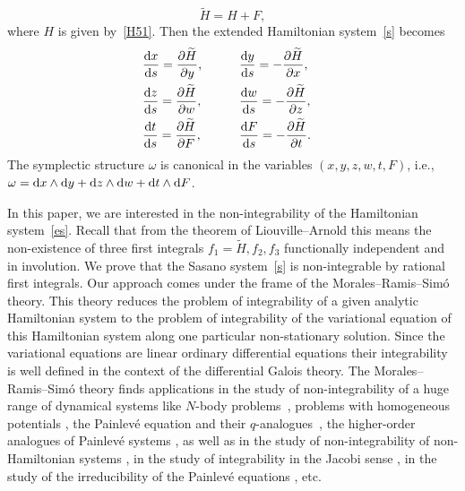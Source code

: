 \documentclass[10pt,a4paper]{amsart}
\numberwithin{equation}{section}
\begin{document}
 \[
 \widetilde{H}=H+F ,
 \]
 where $H$ is given by~\eqref{H51}. Then the extended Hamiltonian system~\eqref{s} becomes
 \begin{alignat}{3}
 &\frac{{\rm d} x}{{\rm d} s}=\frac{\partial \widetilde{H}}{\partial y},\qquad &&
 \frac{{\rm d} y}{{\rm d} s}=-\frac{\partial \widetilde{H}}{\partial x},\nonumber&\\
 &\frac{{\rm d} z}{{\rm d} s}=\frac{\partial \widetilde{H}}{\partial w},\qquad &&
 \frac{{\rm d} w}{{\rm d} s}=-\frac{\partial \widetilde{H}}{\partial z},\nonumber&\\
 &\frac{{\rm d} t}{{\rm d} s}=\frac{\partial \widetilde{H}}{\partial F},\qquad &&
 \frac{{\rm d} F}{{\rm d} s}=-\frac{\partial \widetilde{H}}{\partial t} .&\label{es}
 \end{alignat}
 The symplectic structure $\omega$ is canonical in the variables $(x, y, z, w, t, F)$, i.e.,
 $\omega={\rm d} x \wedge {\rm d} y + {\rm d} z \wedge {\rm d} w + {\rm d} t \wedge {\rm d} F$.

 In this paper, we are interested in the non-integrability
 of the Hamiltonian system~\eqref{es}.
 Recall that from the theorem of Liouville--Arnold \cite{Ar} this means the non-existence of
 three first integrals $f_1=\widetilde{H}, f_2, f_3$ functionally independent and in involution.
 We prove that the Sasano system~\eqref{s} is non-integrable by rational first integrals. Our approach comes under the frame of the Morales--Ramis--Sim\'{o} theory. This theory
 reduces the problem of integrability of a given analytic Hamiltonian system to the problem of integrability of
 the variational equation of this Hamiltonian system along one particular non-stationary solution. Since the
 variational equations are linear ordinary differential equations their integrability is well defined in the context
 of the differential Galois theory. The Morales--Ramis--Sim\'o theory finds applications in the study of non-integrability of a huge range of dynamical systems like
 $N$-body problems~\mbox{\cite{BC, Co3, MPSS, PM, Ts1, Ts2}}, problems with homogeneous potentials \cite{CDMP, Co1, CMP}, the Painlev\'e equation and their $q$-analogues~\mbox{\cite{CR, F, M, St1, St2, St3}},
 the higher-order analogues of Painlev\'e systems \cite{St4},
 as well as in the study of non-integrability of non-Hamiltonian systems \cite{AZ, C}, in the study of integrability in the Jacobi sense \cite{MP}, in the study of the irreducibility
of the Painlev\'e equations \cite{CW}, etc.
\end{document}
